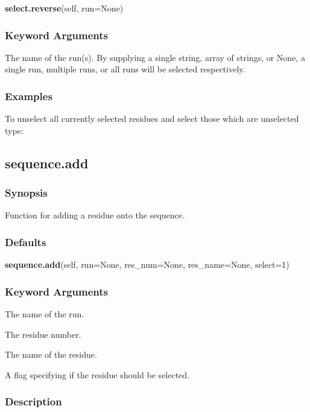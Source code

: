 \textsf{\textbf{select.reverse}(self, run=None)}


\subsubsection{Keyword Arguments}


  The name of the run(s).  By supplying a single string, array of strings, or None, a single run, multiple runs, or all runs will be selected respectively.

\subsubsection{Examples}

To unselect all currently selected residues and select those which are unselected type:




\newpage

\subsection{sequence.add}


\subsubsection{Synopsis}

Function for adding a residue onto the sequence.

\subsubsection{Defaults}

\textsf{\textbf{sequence.add}(self, run=None, res\_num=None, res\_name=None, select=1)}


\subsubsection{Keyword Arguments}


  The name of the run.

  The residue number.

  The name of the residue.

  A flag specifying if the residue should be selected.

\subsubsection{Description}

